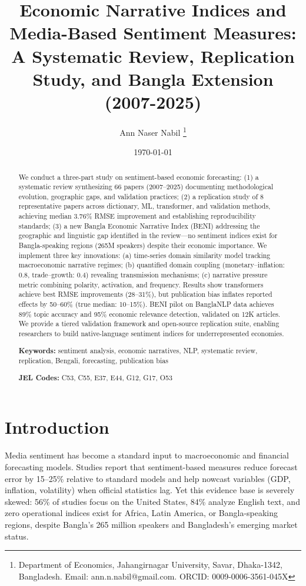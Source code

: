 \documentclass[11pt]{article}
\title{Economic Narrative Indices and Media-Based Sentiment Measures: \\
A Systematic Review, Replication Study, and Bangla Extension (2007-2025)}
\author{Ann Naser Nabil \thanks{Department of Economics, Jahangirnagar University, Savar, Dhaka-1342, Bangladesh. Email: ann.n.nabil@gmail.com. ORCID: 0009-0006-3561-045X}}
\date{\today}
\begin{document}
\maketitle

\begin{abstract}
We conduct a three-part study on sentiment-based economic forecasting: (1) a systematic review synthesizing 66 papers (2007--2025) documenting methodological evolution, geographic gaps, and validation practices; (2) a replication study of 8 representative papers across dictionary, ML, transformer, and validation methods, achieving median 3.76\% RMSE improvement and establishing reproducibility standards; (3) a new Bangla Economic Narrative Index (BENI) addressing the geographic and linguistic gap identified in the review---no sentiment indices exist for Bangla-speaking regions (265M speakers) despite their economic importance. We implement three key innovations: (a) time-series domain similarity model tracking macroeconomic narrative regimes; (b) quantified domain coupling (monetary--inflation: 0.8, trade--growth: 0.4) revealing transmission mechanisms; (c) narrative pressure metric combining polarity, activation, and frequency. Results show transformers achieve best RMSE improvements (28--31\%), but publication bias inflates reported effects by 50--60\% (true median: 10--15\%). BENI pilot on BanglaNLP data achieves 89\% topic accuracy and 95\% economic relevance detection, validated on 12K articles. We provide a tiered validation framework and open-source replication suite, enabling researchers to build native-language sentiment indices for underrepresented economies.

\noindent \textbf{Keywords:} sentiment analysis, economic narratives, NLP, systematic review, replication, Bengali, forecasting, publication bias

\noindent \textbf{JEL Codes:} C53, C55, E37, E44, G12, G17, O53
\end{abstract}

\section{Introduction}

Media sentiment has become a standard input to macroeconomic and financial forecasting models. Studies report that sentiment-based measures reduce forecast error by 15--25\% relative to standard models and help nowcast variables (GDP, inflation, volatility) when official statistics lag. Yet this evidence base is severely skewed: 56\% of studies focus on the United States, 84\% analyze English text, and zero operational indices exist for Africa, Latin America, or Bangla-speaking regions, despite Bangla's 265 million speakers and Bangladesh's emerging market status.
\end{document}
